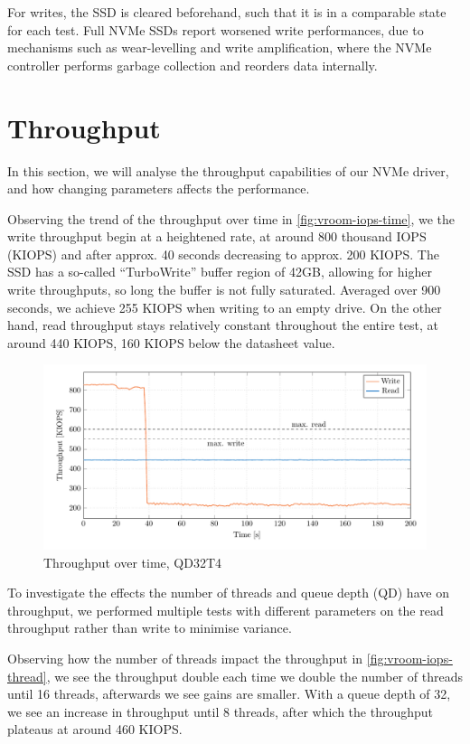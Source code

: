 For writes, the SSD is cleared beforehand, such that it is in a comparable state for each test. Full NVMe SSDs report worsened write performances, due to mechanisms such as wear-levelling and write amplification, where the NVMe controller performs garbage collection and reorders data internally.

\section{Throughput}
In this section, we will analyse the throughput capabilities of our NVMe driver, and how changing parameters affects the performance.

Observing the trend of the throughput over time in \autoref{fig:vroom-iops-time}, we the write throughput begin at a heightened rate, at around 800 thousand IOPS (KIOPS) and after approx. 40 seconds decreasing to approx. 200 KIOPS. The SSD has a so-called ``TurboWrite'' buffer region of 42GB, allowing for higher write throughputs, so long the buffer is not fully saturated. Averaged over 900 seconds, we achieve 255 KIOPS when writing to an empty drive. On the other hand, read throughput stays relatively constant throughout the entire test, at around 440 KIOPS, 160 KIOPS below the datasheet value.

\begin{figure}
  \centering
    \includegraphics[width=\textwidth]{figures/vroom-iops-time}
    \caption{Throughput over time, QD32T4}
    \label{fig:vroom-iops-time}
\end{figure}

To investigate the effects the number of threads and queue depth (QD) have on throughput, we performed multiple tests with different parameters on the read throughput rather than write to minimise variance.

Observing how the number of threads impact the throughput in \autoref{fig:vroom-iops-thread}, we see the throughput double each time we double the number of threads until 16 threads, afterwards we see gains are smaller. With a queue depth of 32, we see an increase in throughput until 8 threads, after which the throughput plateaus at around 460 KIOPS.

